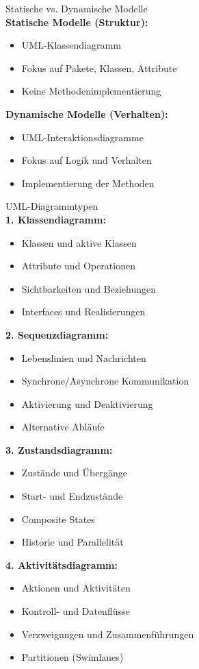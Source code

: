 \begin{KR}{Statische vs. Dynamische Modelle}\\
\textbf{Statische Modelle (Struktur):}
\begin{itemize}
    \item UML-Klassendiagramm
    \item Fokus auf Pakete, Klassen, Attribute
    \item Keine Methodenimplementierung
\end{itemize}

\textbf{Dynamische Modelle (Verhalten):}
\begin{itemize}
    \item UML-Interaktionsdiagramme
    \item Fokus auf Logik und Verhalten
    \item Implementierung der Methoden
\end{itemize}
\end{KR}

\begin{definition}{UML-Diagrammtypen}\\
\textbf{1. Klassendiagramm:}
\begin{itemize}
    \item Klassen und aktive Klassen
    \item Attribute und Operationen
    \item Sichtbarkeiten und Beziehungen
    \item Interfaces und Realisierungen
\end{itemize}

\textbf{2. Sequenzdiagramm:}
\begin{itemize}
    \item Lebenslinien und Nachrichten
    \item Synchrone/Asynchrone Kommunikation
    \item Aktivierung und Deaktivierung
    \item Alternative Abläufe
\end{itemize}

\textbf{3. Zustandsdiagramm:}
\begin{itemize}
    \item Zustände und Übergänge
    \item Start- und Endzustände
    \item Composite States
    \item Historie und Parallelität
\end{itemize}

\textbf{4. Aktivitätsdiagramm:}
\begin{itemize}
    \item Aktionen und Aktivitäten
    \item Kontroll- und Datenflüsse
    \item Verzweigungen und Zusammenführungen
    \item Partitionen (Swimlanes)
\end{itemize}
\end{definition}

